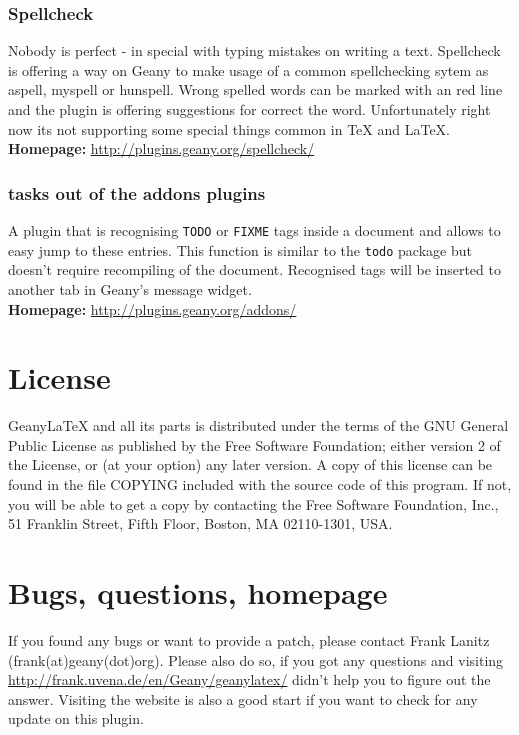 \documentclass[%
a4paper,%
10pt,%
oneside,%
DIV18,
headsepline,
plainheadsepline,
footsepline,
plainfootsepline,
bibtotoc,%
liststotoc,%
BCOR12mm,%
halfparskip,%
openany,%
]{scrartcl}
\begin{document}
\subsubsection{Spellcheck}
Nobody is perfect - in special with typing mistakes on writing a
text. Spellcheck is offering a way on Geany to make usage of a
common spellchecking sytem as aspell, myspell or hunspell. Wrong
spelled words can be marked with an red line and the plugin is
offering suggestions for correct the word. Unfortunately right now
its not supporting some special things common in \TeX{} and \LaTeX{}.\\
\textbf{Homepage:} \url{http://plugins.geany.org/spellcheck/}

\subsubsection{tasks out of the addons plugins}
A plugin that is recognising \texttt{TODO} or \texttt{FIXME} tags
inside a document and allows to easy jump to these entries. This
function is similar to the \texttt{todo} package but doesn't require
recompiling of the document. Recognised tags will be inserted to
another tab in Geany's message widget.\\
\textbf{Homepage:} \url{http://plugins.geany.org/addons/}

\section{License}
Geany\LaTeX{} and all its parts is distributed under the terms of the
GNU General Public License as published by the Free Software
Foundation; either version 2 of the License, or (at your option) any
later version. A copy of this license can be found in the file COPYING
included with the source code of this program. If not, you will be
able to get a copy by contacting the Free Software Foundation, Inc.,
51 Franklin Street, Fifth Floor, Boston, MA 02110-1301, USA.


\section{Bugs, questions, homepage}
\label{contact}
If you found any bugs or want to provide a patch, please contact Frank
Lanitz (frank(at)geany(dot)org). Please also do so, if you got any
questions and visiting \\ \url{http://frank.uvena.de/en/Geany/geanylatex/}
didn't help you to figure out the answer. Visiting the website is also
a good start if you want to check for any update on this plugin.
\end{document}
